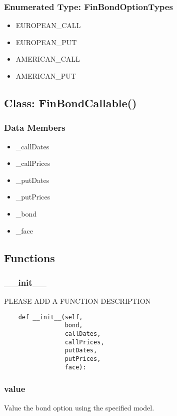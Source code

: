 \documentclass[twoside,11pt]{book}
\begin{document}
\subsubsection{Enumerated Type: FinBondOptionTypes}
\begin{itemize}
\item{EUROPEAN\_CALL}
\item{EUROPEAN\_PUT}
\item{AMERICAN\_CALL}
\item{AMERICAN\_PUT}
\end{itemize}

\subsection*{Class: FinBondCallable()}


\subsubsection*{Data Members}
\begin{itemize}
\item{\_callDates}
\item{\_callPrices}
\item{\_putDates}
\item{\_putPrices}
\item{\_bond}
\item{\_face}
\end{itemize}

\subsection*{Functions}

\subsubsection*{{\bf \_\_init\_\_}}
PLEASE ADD A FUNCTION DESCRIPTION

\begin{lstlisting}
    def __init__(self,
                 bond,
                 callDates,
                 callPrices,
                 putDates,
                 putPrices,
                 face):
\end{lstlisting}

\subsubsection*{{\bf value}}
Value the bond option using the specified model.  
\end{document}

